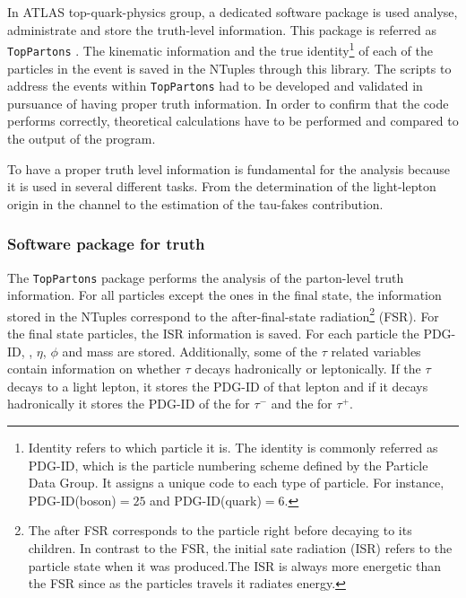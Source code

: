 In ATLAS top-quark-physics group, a dedicated software package 
is used analyse, administrate and store the truth-level information. 
This package is referred as \texttt{TopPartons}  \cite{TopPartonsGitLab}.
The kinematic information and the 
true identity\footnote{Identity refers to which particle it is.
 The identity is commonly referred as PDG-ID, which is the particle 
 numbering scheme defined by the Particle Data Group. 
It assigns a unique code to each type of particle. 
For instance, PDG-ID(\PHiggs boson)$ = 25$ 
and PDG-ID(\Ptop quark)$ = 6$.} of each of the particles 
in the event is saved in the NTuples through this library. The scripts to address
the \tHq events within \texttt{TopPartons} had to be developed and validated in
pursuance of having proper truth information. In order to confirm that the
code performs correctly, theoretical calculations have to be performed and compared
to the output of the program.    

To have a proper truth level information is fundamental for the analysis because it is
used in several different tasks. From the determination of the light-lepton origin in
the \dilepSStau channel to the estimation of the tau-fakes contribution. 

\subsubsection{Software package for truth}
\label{sec:ChaptH:Sig:truth:TopPartons}
The \texttt{TopPartons} package performs the analysis of the parton-level truth information.
For all particles except the ones in the final state, the information stored in the NTuples
correspond to the after-final-state radiation\footnote{The after FSR corresponds to the
 particle right before decaying to its children. In contrast to the FSR, the initial sate radiation (ISR) refers to the particle state when it was produced.The ISR is always more energetic than the FSR since as the
 particles travels it radiates energy.} (FSR).  For the final state particles, the ISR information is saved.
For each particle the PDG-ID, \pT, $\eta$, $\phi$ and mass are stored. Additionally, some of the $\tau$ related
variables contain information on whether $\tau$ decays hadronically or leptonically.  If the $\tau$ decays to a 
light lepton, it stores the PDG-ID of that lepton and if it decays hadronically it stores the PDG-ID of the \PWm for $\tau^-$ 
and the \PWp for $\tau^+$.



